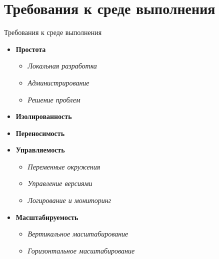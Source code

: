 \section{Требования к среде выполнения}\label{sec:deploy}

\begin{frame}{Требования к среде выполнения}

    \begin {itemize}
    \item \textbf{Простота}
    \begin{itemize}
        \item \textit{Локальная разработка}
        \item \textit{Администрирование}
        \item \textit{Решение проблем}
    \end{itemize}

    \item \textbf{Изолированность}
    \item \textbf{Переносимость}
    \item \textbf{Управляемость}
    \begin{itemize}
        \item \textit{Переменные окружения}
        \item \textit{Управление версиями}
        \item \textit{Логирование и мониторинг}
    \end{itemize}

    \item \textbf{Масштабируемость}
    \begin{itemize}
        \item \textit{Вертикальное масштабирование}
        \item \textit{Горизонтальное масштабирование}
    \end{itemize}

    \end{itemize}

\end{frame}

